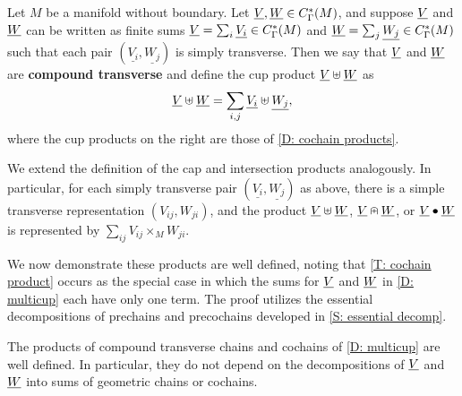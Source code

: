 \begin{definition}\label{D: multicup}
	Let $M$ be a manifold without boundary.
	Let $\underline{V}, \underline{W} \in C_\Gamma^*(M)$, and suppose $\underline{V}$ and $\underline{W}$ can be written as finite sums $\underline{V} = \sum_i \underline{V_i} \in C_\Gamma^*(M)$ and $\underline{W} = \sum_j \underline{W_j} \in C_\Gamma^*(M)$ such that each pair $(\underline{V_i},\underline{W_j})$ is simply transverse.
	Then we say that $\underline{V}$ and $\underline{W}$ are \textbf{compound transverse} and define the cup product $\underline{V}\uplus\underline{W}$ as $$\underline{V}\uplus\underline{W} = \sum_{i,j} \underline{V_i}\uplus \underline{W_j},$$
	where the cup products on the right are those of \cref{D: cochain products}.

	We extend the definition of the cap and intersection products analogously.
	In particular, for each simply transverse pair $(\underline{V_i},\underline{W_j})$ as above, there is a simple transverse representation $(V_{ij}, W_{ji})$, and the product $\underline{V}\uplus \underline{W}$, $\underline{V}\nplus \underline{W}$, or $\underline{V}\bullet\underline{W}$ is represented by $\sum_{ij}V_{ij} \times_M W_{ji}$.
\end{definition}


\begin{comment}
	\begin{theorem}
		Let $M$ be a manifold without boundary.
		Suppose $\underline{V_1}, \underline{V_2} \in C_\Gamma^*(M)$ are both transverse to $\uW \in C_\Gamma^*(M)$.
		Then $\underline{V_1 + V_2}$ is transverse to $\uW$ and $$\underline{V_1 + V_2} \uplus \uW = \underline{V_1} \uplus \uW + \underline{V_2} \uplus \uW.$$
		The equivalent statements hold for the cap and intersection products and with the sum in the second variable.
	\end{theorem}
	\begin{proof}
		By definition, we can write

	\end{proof}
\end{comment}

We now demonstrate these products are well defined, noting that \cref{T: cochain product} occurs as the special case in which the sums for $\underline{V}$ and $\underline{W}$ in \cref{D: multicup} each have only one term.
The proof utilizes the essential decompositions of prechains and precochains developed in \cref{S: essential decomp}.

\begin{theorem}\label{T: multicup}
	The products of compound transverse chains and cochains of \cref{D: multicup} are well defined.
	In particular, they do not depend on the decompositions of $\underline{V}$ and $\underline{W}$ into sums of geometric chains or cochains.
\end{theorem}

